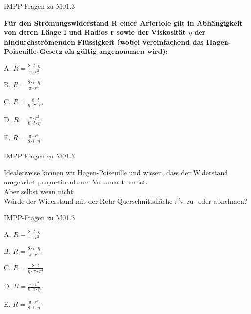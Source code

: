 \documentclass{beamer}
\begin{document}

\begin{frame}{IMPP-Fragen zu M01.3}


    \textbf{
    Für den Strömungswiderstand R einer Arteriole gilt in Abhängigkeit von deren Länge l und Radios r sowie der Viskosität \(\eta\) der hindurchströmenden Flüssigkeit (wobei vereinfachend das Hagen-Poiseuille-Gesetz als gültig angenommen wird):
    } \\[0.2 cm]

\begin{description}
\item{A.}
\(R=\frac{8\cdot l\cdot \eta}{\pi \cdot r^2}\)
\item{B.}
\(R=\frac{8\cdot l\cdot \eta}{\pi \cdot r^4}\)  %
\item{C.}
\(R=\frac{8\cdot l}{\eta \cdot \pi  \cdot r^4}\)
\item{D.}
\(R=\frac{\pi \cdot r^2}{8\cdot l \cdot \eta}\)
\item{E.}
\(R=\frac{\pi\cdot r^4}{8\cdot l \cdot \eta}\)
\end{description}
\end{frame}


\begin{frame}{IMPP-Fragen zu M01.3}

Idealerweise können wir Hagen-Poiseuille und wissen, dass der Widerstand umgekehrt proportional zum Volumenstrom ist. \\

\pause
Aber selbst wenn nicht: \pause \\
 
Würde der Widerstand mit der Rohr-Querschnittsfläche \(r^2 \pi\) zu- oder abnehmen?

\end{frame}

\begin{frame}{IMPP-Fragen zu M01.3}

\begin{description}
\item{A.}
\(R=\frac{8\cdot l\cdot \eta}{\pi \cdot r^2}\)
\item{B.}
\(R=\frac{8\cdot l\cdot \eta}{\pi \cdot r^4}\)  %
\item{C.}
\(R=\frac{8\cdot l}{\eta \cdot \pi  \cdot r^4}\)
\item{D.}
\sout{\(R=\frac{\pi \cdot r^2}{8\cdot l \cdot \eta}\)}
\item{E.}
\sout{\(R=\frac{\pi\cdot r^4}{8\cdot l \cdot \eta}\)}
\end{description}
\end{frame}
\end{document}
